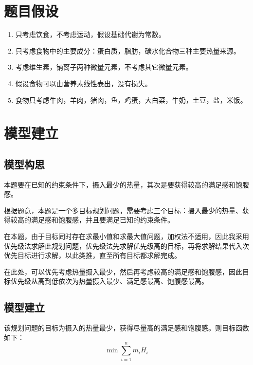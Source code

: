 \documentclass{SYSUReport}
\begin{document}
\section{题目假设}
    \begin{enumerate}
        \item 只考虑饮食，不考虑运动，假设基础代谢为常数。    \vspace{-0.3cm}
        \item 只考虑食物中的主要成分：蛋白质，脂肪，碳水化合物三种主要热量来源。    \vspace{-0.3cm}
        \item 考虑维生素，钠离子两种微量元素，不考虑其它微量元素。    \vspace{-0.3cm}
        \item 假设食物可以由营养素线性表出，没有损失。    \vspace{-0.3cm}
        \item 食物只考虑牛肉，羊肉，猪肉，鱼，鸡蛋，大白菜，牛奶，土豆，盐，米饭。    \vspace{-0.3cm}
    \end{enumerate}

\section{模型建立}
\subsection{模型构思}
本题要在已知的约束条件下，摄入最少的热量，其次是要获得较高的满足感和饱腹感。

根据题意，本题是一个多目标规划\cite{csdn_blog_post}问题，需要考虑三个目标：摄入最少的热量、获得较高的满足感和饱腹感，并且要满足已知的约束条件。

在本题，由于目标同时存在求最小值和求最大值问题，加权法不适用，因此我采用优先级法求解此规划问题，优先级法先求解优先级高的目标，再将求解结果代入次优先目标进行求解，以此类推，直至所有目标都求解完成。

在此处，可以优先考虑热量摄入最少，然后再考虑较高的满足感和饱腹感，因此目标优先级从高到低依次为热量摄入最少、满足感最高、饱腹感最高。

\subsection{模型建立}
该规划问题的目标为摄入的热量最少，获得尽量高的满足感和饱腹感。则目标函数如下：
\begin{equation}
\min \sum_{i=1}^{n} m_i H_i
\end{equation}
\end{document}
